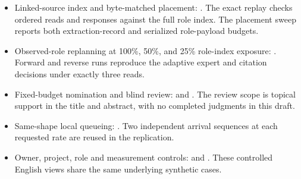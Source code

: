 \begin{itemize}
\item Linked-source index and byte-matched placement: . The exact replay checks ordered reads and responses against the full role index. The placement sweep reports both extraction-record and serialized role-payload budgets.
\item Observed-role replanning at 100\%, 50\%, and 25\% role-index exposure: . Forward and reverse runs reproduce the adaptive expert and citation decisions under exactly three reads.
\item Fixed-budget nomination and blind review:  and . The review scope is topical support in the title and abstract, with no completed judgments in this draft.
\item Same-shape local queueing: . Two independent arrival sequences at each requested rate are reused in the replication.
\item Owner, project, role and measurement controls:  and . These controlled English views share the same underlying synthetic cases.


\end{itemize}
